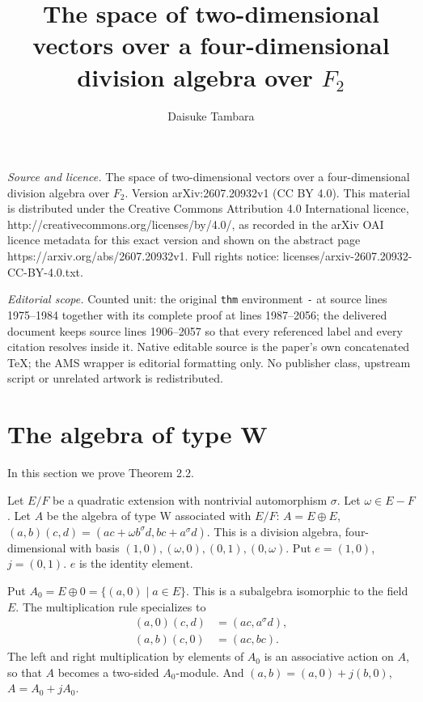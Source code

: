 \documentclass[10pt,a4paper]{amsart}
\begin{document}
\title[The space of two-dimensional vectors over a four-dimensional]{The space of two-dimensional vectors over a four-dimensional division algebra over $F_2$}
\author{Daisuke Tambara}
\date{}
\maketitle
\noindent\emph{Source and licence.} The space of two-dimensional vectors over a four-dimensional division algebra over $F_2$. Version arXiv:2607.20932v1 (CC BY 4.0). This material is distributed under the Creative Commons Attribution 4.0 International licence, http://creativecommons.org/licenses/by/4.0/, as recorded in the arXiv OAI licence metadata for this exact version and shown on the abstract page https://arxiv.org/abs/2607.20932v1. Full rights notice: licenses/arxiv-2607.20932-CC-BY-4.0.txt.\par\smallskip
\noindent\textit{Editorial scope.} Counted unit: the original \texttt{thm} environment \texttt{-} at source lines 1975--1984 together with its complete proof at lines 1987--2056; the delivered document keeps source lines 1906--2057 so that every referenced label and every citation resolves inside it. Native editable source is the paper's own concatenated TeX; the AMS wrapper is editorial formatting only. No publisher class, upstream script or unrelated artwork is redistributed.
\section{The algebra of type W}

In this section we prove Theorem 2.2.

Let $E/F$ be a quadratic extension with nontrivial automorphism $\sigma$.
Let $\omega\in E-F$.
Let $A$ be the algebra of type W associated with $E/F$:
$A=E\oplus E$, 
$(a,b)(c,d)=(ac+\omega b^{\sigma}d, bc+a^{\sigma}d)$.
This is a division algebra,  four-dimensional with basis
$(1,0), (\omega,0), (0,1), (0,\omega)$.
Put $e=(1,0)$, $j=(0,1)$. $e$ is the identity element.

Put $A_0=E\oplus 0=\{(a,0)\mid a\in E\}$.
This is a subalgebra isomorphic to the field $E$.
The multiplication rule specializes to
\begin{align*}
(a,0)(c,d)&=(ac, a^{\sigma}d),\\
(a,b)(c,0)&=(ac,bc).
\end{align*}
The left and right multiplication by elements of $A_0$  is an associative action 
on  $A$, so that $A$ becomes a two-sided $A_0$-module.
And
$(a,b)=(a,0)+j(b,0)$,
$A=A_0+jA_0$.
\end{document}
